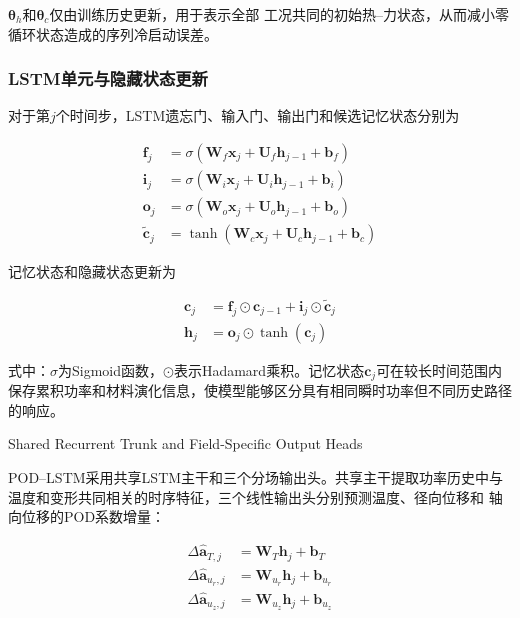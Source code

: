 $\boldsymbol\theta_h$和$\boldsymbol\theta_c$仅由训练历史更新，用于表示全部
工况共同的初始热--力状态，从而减小零循环状态造成的序列冷启动误差。

\subsubsection{LSTM单元与隐藏状态更新}

对于第$j$个时间步，LSTM遗忘门、输入门、输出门和候选记忆状态分别为

\begin{align}
	\boldsymbol{f}_j
	&=\sigma\left(
	\boldsymbol{W}_f\boldsymbol{x}_j
	+\boldsymbol{U}_f\boldsymbol{h}_{j-1}
	+\boldsymbol{b}_f\right)
	\label{eq:lstm_forget_gate}\\
	\boldsymbol{i}_j
	&=\sigma\left(
	\boldsymbol{W}_i\boldsymbol{x}_j
	+\boldsymbol{U}_i\boldsymbol{h}_{j-1}
	+\boldsymbol{b}_i\right)
	\label{eq:lstm_input_gate}\\
	\boldsymbol{o}_j
	&=\sigma\left(
	\boldsymbol{W}_o\boldsymbol{x}_j
	+\boldsymbol{U}_o\boldsymbol{h}_{j-1}
	+\boldsymbol{b}_o\right)
	\label{eq:lstm_output_gate}\\
	\widetilde{\boldsymbol{c}}_j
	&=\tanh\left(
	\boldsymbol{W}_c\boldsymbol{x}_j
	+\boldsymbol{U}_c\boldsymbol{h}_{j-1}
	+\boldsymbol{b}_c\right)
	\label{eq:lstm_candidate_state}
\end{align}

记忆状态和隐藏状态更新为

\begin{align}
	\boldsymbol{c}_j
	&=
	\boldsymbol{f}_j\odot\boldsymbol{c}_{j-1}
	+
	\boldsymbol{i}_j\odot\widetilde{\boldsymbol{c}}_j
	\label{eq:lstm_cell_update}\\
	\boldsymbol{h}_j
	&=
	\boldsymbol{o}_j\odot\tanh(\boldsymbol{c}_j)
	\label{eq:lstm_hidden_update}
\end{align}

式中：$\sigma$为Sigmoid函数，$\odot$表示Hadamard乘积。记忆状态$\boldsymbol{c}_j$可在较长时间范围内保存累积功率和材料演化信息，使模型能够区分具有相同瞬时功率但不同历史路径的响应。

{Shared Recurrent Trunk and Field-Specific Output Heads}

POD--LSTM采用共享LSTM主干和三个分场输出头。共享主干提取功率历史中与
温度和变形共同相关的时序特征，三个线性输出头分别预测温度、径向位移和
轴向位移的POD系数增量：

\begin{align}
	\Delta\widehat{\boldsymbol a}_{T,j}
	&=\boldsymbol W_T\boldsymbol h_j+\boldsymbol b_T\\
	\Delta\widehat{\boldsymbol a}_{u_r,j}
	&=\boldsymbol W_{u_r}\boldsymbol h_j+\boldsymbol b_{u_r}\\
	\Delta\widehat{\boldsymbol a}_{u_z,j}
	&=\boldsymbol W_{u_z}\boldsymbol h_j+\boldsymbol b_{u_z}
	\label{eq:formal_lstm_heads}
\end{align}

